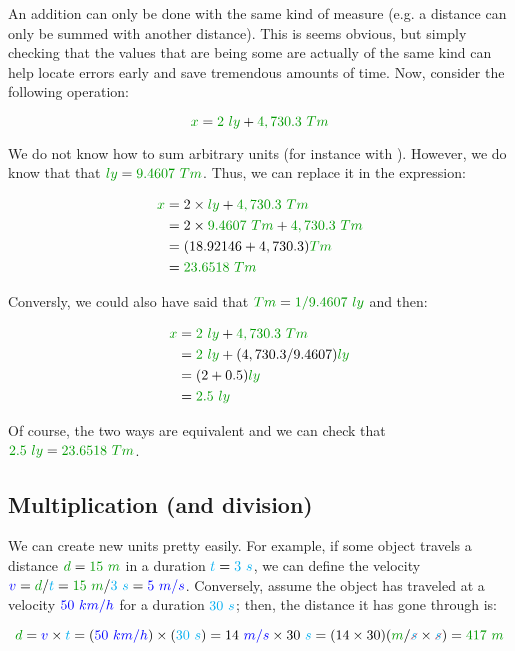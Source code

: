 An addition can only be done with the same kind of measure (e.g. a
distance can only be summed with another distance). This is seems obvious,
but simply checking that the values that are being some are actually of
the same kind can help locate errors early and save tremendous amounts
of time. Now, consider the following operation:

\[
\dist{x} = \dist{2~ly} + \dist{4,730.3~Tm}
\]

We do not know how to sum arbitrary units (for instance 
with ). However, we do know that that $\dist{ly} =
\dist{9.4607~Tm}$. Thus, we can replace it in the expression:

\begin{align*}
\dist{x}
&= 2 \times \dist{ly} + \dist{4,730.3~Tm} \\
&= 2 \times \dist{9.4607~Tm} + \dist{4,730.3~Tm} \\
&= (18.92146 + 4,730.3) \dist{Tm} \\
&= \dist{23.6518~Tm}
\end{align*}

Conversly, we could also have said that $\dist{Tm} = \dist{1/9.4607~ly}$
and then:

\begin{align*}
\dist{x}
&= \dist{2~ly} + \dist{4,730.3~Tm} \\
&= \dist{2~ly} + (4,730.3 / 9.4607) \dist{ly} \\
&= (2 + 0.5) \dist{ly} \\
&= \dist{2.5~ly}
\end{align*}

Of course, the two ways are equivalent and we can check that
$\dist{2.5~ly} = \dist{23.6518~Tm}$.


\subsection{Multiplication (and division)}

We can create new units pretty easily. For example, if some object
travels a distance $\dist{d} = \dist{15~m}$ in a duration $\textcolor{cyan}{t}
= \textcolor{cyan}{3~s}$, we can define the velocity $\speed{v} = \dist{d} /
\delay{t} = \dist{15~m} / \delay{3~s} = \speed{5~m/s}$. Conversely,
assume the object has traveled at a velocity $\textcolor{blue}{50~km/h}$ for a
duration $\textcolor{cyan}{30~s}$; then, the distance it has gone through is:

\[
\dist{d}
= \speed{v} \times \delay{t}
= (\speed{50~km/h}) \times (\delay{30~s})
= 14~\speed{m/s} \times 30~\delay{s}
= (14 \times 30) (\dist{m}/\strike[red]{\delay{s}} \times \strike[red]{\delay{s}})
= \dist{417~m}
\]

